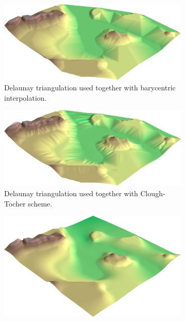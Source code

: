 \documentclass[a4paper,10pt]{report}
\begin{document}
\begin{figure}[H]
    \centering
    \begin{subfigure}{.32\textwidth}
        \includegraphics[width=\textwidth]{../images/differences/Delaunay_Triangulation_and_Barycentric_Interpolation_3D.png}
    \caption{Delaunay triangulation used together with barycentric interpolation.}
    \label{fig:3D_discretized_comparison_a}
    \end{subfigure}
    \hfill
    \begin{subfigure}{.32\textwidth}
        \includegraphics[width=\textwidth]{../images/differences/Delaunay_Triangulation_and_Clough-Tocher_scheme_3D.png}
    \caption{Delaunay triangulation used together with Clough-Tocher scheme.}
    \label{fig:3D_discretized_comparison_b}
    \end{subfigure}
    \hfill
    \begin{subfigure}{.32\textwidth}
        \includegraphics[width=\textwidth]{../images/differences/Radial_Basis_Thin_Plate_Spline_3D.png}

\end{subfigure}
\end{figure}
\end{document}
